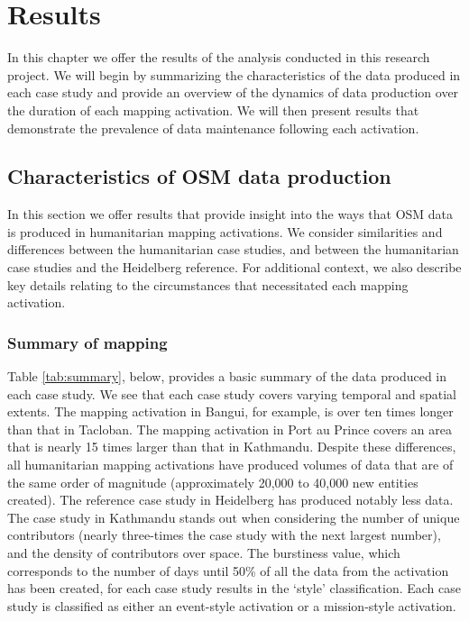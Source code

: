 \chapter{Results}
\label{chapterlabel5}

In this chapter we offer the results of the analysis conducted in this research project. We will begin by summarizing the characteristics of the data produced in each case study and provide an overview of the dynamics of data production over the duration of each mapping activation. We will then present results that demonstrate the prevalence of data maintenance following each activation. 

\section{Characteristics of OSM data production}

In this section we offer results that provide insight into the ways that OSM data is produced in humanitarian mapping activations. We consider similarities and differences between the humanitarian case studies, and between the humanitarian case studies and the Heidelberg reference. For additional context, we also describe key details relating to the circumstances that necessitated each mapping activation. 

\subsection{Summary of mapping}

Table \ref{tab:summary}, below, provides a basic summary of the data produced in each case study. We see that each case study covers varying temporal and spatial extents. The mapping activation in Bangui, for example, is over ten times longer than that in Tacloban. The mapping activation in Port au Prince covers an area that is nearly 15 times larger than that in Kathmandu. Despite these differences, all humanitarian mapping activations have produced volumes of data that are of the same order of magnitude (approximately 20,000 to 40,000 new entities created). The reference case study in Heidelberg has produced notably less data. The case study in Kathmandu stands out when considering the number of unique contributors (nearly three-times the case study with the next largest number), and the density of contributors over space. The burstiness value, which corresponds to the number of days until 50\% of all the data from the activation has been created, for each case study results in the ‘style’ classification. Each case study is classified as either an event-style activation or a mission-style activation. 

